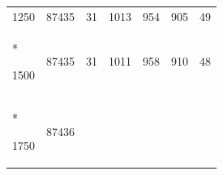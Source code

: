 \documentclass[
  12pt,
  oneside,
  openany]{book}
\begin{document}
\begin{appendices}
\begin{singlespace}
\begin{longtable}[]{@{}lllllll@{}}
\begin{minipage}[t]{0.13\columnwidth}\raggedright
1250\strut
\end{minipage} & \begin{minipage}[t]{0.16\columnwidth}\raggedright
87435\strut
\end{minipage} & \begin{minipage}[t]{0.16\columnwidth}\raggedright
31\strut
\end{minipage} & \begin{minipage}[t]{0.11\columnwidth}\raggedright
1013\strut
\end{minipage} & \begin{minipage}[t]{0.07\columnwidth}\raggedright
954\strut
\end{minipage} & \begin{minipage}[t]{0.07\columnwidth}\raggedright
905\strut
\end{minipage} & \begin{minipage}[t]{0.10\columnwidth}\raggedright
49\strut
\end{minipage}\tabularnewline*
\begin{minipage}[t]{0.13\columnwidth}\raggedright
1500\strut
\end{minipage} & \begin{minipage}[t]{0.16\columnwidth}\raggedright
87435\strut
\end{minipage} & \begin{minipage}[t]{0.16\columnwidth}\raggedright
31\strut
\end{minipage} & \begin{minipage}[t]{0.11\columnwidth}\raggedright
1011\strut
\end{minipage} & \begin{minipage}[t]{0.07\columnwidth}\raggedright
958\strut
\end{minipage} & \begin{minipage}[t]{0.07\columnwidth}\raggedright
910\strut
\end{minipage} & \begin{minipage}[t]{0.10\columnwidth}\raggedright
48\strut
\end{minipage}\tabularnewline*
\begin{minipage}[t]{0.13\columnwidth}\raggedright
1750\strut
\end{minipage} & \begin{minipage}[t]{0.16\columnwidth}\raggedright
87436\strut
\end{minipage} & \begin{minipage}[t]{0.16\columnwidth}\raggedright

\end{minipage}
\end{longtable}
\end{singlespace}
\end{appendices}
\end{document}
